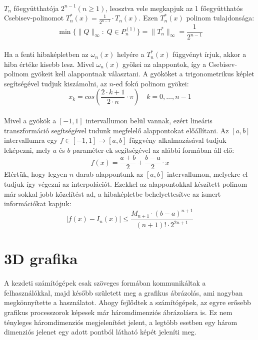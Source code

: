 \documentclass[12pt]{report}
\begin{document}
\paragraph{}
$T_n$ főegyütthatója $2^{n-1} (n \geq 1)$, leosztva vele megkapjuk az 1 főegyütthatós Csebisev-polinomot $T^*_n(x) = \frac{1}{2^{n-1}} \cdot T_n(x)$.
Ezen $T^*_n(x)$ polinom tulajdonsága:
$$
\min\{ \|Q\|_\infty : \; Q \in P^{(1)}_n\} = \|T^*_n\|_\infty = \frac{1}{2^{n-1}}
$$
\paragraph{}
Ha a fenti hibaképletben az $\omega_n(x)$ helyére a $T^*_n(x)$ függvényt írjuk, akkor a hiba értéke kisebb lesz. Mivel $\omega_n(x)$ gyökei az alappontok, így a Csebisev-polinom gyökeit kell alappontnak választani. A gyököket a  trigonometrikus képlet segítségével tudjuk kiszámolni, az $n$-ed fokú polinom gyökei:
$$
x_k = cos(\frac{2 \cdot k + 1}{2 \cdot n} \cdot \pi) \quad k = 0, \dots , n-1
$$
\paragraph{}
Mivel a gyökök a $[-1, 1]$ intervallumon belül vannak, ezért lineáris transzformáció segítségével tudunk megfelelő alappontokat előállítani. Az $[a,b]$ intervallumra egy $f \in [-1,1] \rightarrow [a,b]$ függvény alkalmazásával tudjuk leképezni, mely $a$ és $b$ paraméter-ek segítségével az alábbi formában áll elő:
$$
f(x) = \frac{a+b}{2}+\frac{b-a}{2} \cdot x
$$
Elértük, hogy legyen $n$ darab alappontunk az $[a,b]$ intervallumon, melyekre el tudjuk így végezni az interpolációt. Ezekkel az alappontokkal készített polinom már sokkal jobb közelítést ad, a hibaképletbe behelyettesítve az ismert információkat kapjuk:
$$
|f(x)-I_n(x)| \leq \frac{M_{n+1}\cdot(b-a)^{n+1}}{(n+1)! \cdot 2^{2n+1}}
$$

\section{3D grafika}
\paragraph{}
A kezdeti számítógépek csak szöveges formában kommunikáltak a felhasználókkal, majd később született meg a grafikus ábrázolás, ami nagyban megkönnyítette a használatot. Ahogy fejlődtek a számítógépek, az egyre erősebb grafikus processzorok képesek már háromdimenziós ábrázolásra is. Ez nem tényleges háromdimenziós megjelenítést jelent, a legtöbb esetben egy három dimenziós jelenet egy adott pontból látható képét jeleníti meg.
\end{document}
